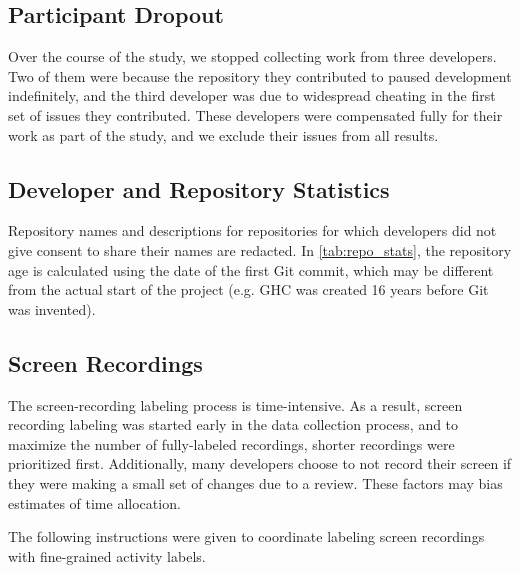 \documentclass{article}
\begin{document}
\subsection{Participant Dropout}

Over the course of the study, we stopped collecting work from three developers. Two of them were because the repository they contributed to paused development indefinitely, and the third developer was due to widespread cheating in the first set of issues they contributed. These developers were compensated fully for their work as part of the study, and we exclude their issues from all results.

\subsection{Developer and Repository Statistics}
\label{sec:devandrepostatistics}

Repository names and descriptions for repositories for which developers did not give consent to share their names are redacted. In \autoref{tab:repo_stats}, the repository age is calculated using the date of the first Git commit, which may be different from the actual start of the project (e.g. GHC was created 16 years before Git was invented).

\begin{center}
\maintainerStatsTable
\end{center}

\begin{center}
\repoStatsTable
\end{center}


\subsection{Screen Recordings}
\label{sec:screen_recording_instructions}

The screen-recording labeling process is time-intensive. As a result, screen recording labeling was started early in the data collection process, and to maximize the number of fully-labeled recordings, shorter recordings were prioritized first. Additionally, many developers choose to not record their screen if they were making a small set of changes due to a review. These factors may bias estimates of time allocation.

The following instructions were given to coordinate labeling screen recordings with fine-grained activity labels.
\end{document}
